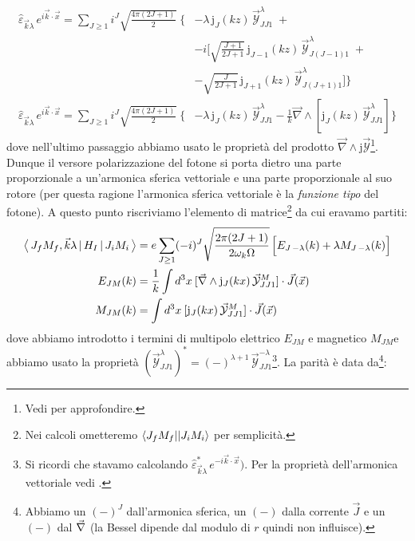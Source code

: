 \begin{displaymath}
\begin{aligned}
\widehat{\varepsilon}_{\vec{k}\lambda}\, e^{i\vec{k}\cdot\vec{x}} = \sum_{J \geq 1} i^J \sqrt{\frac{4\pi (2J+1)}{2}} \;\Biggl \{& -\lambda \,\mathrm{j}_J (kz) \, \vec{\mathcal{Y}}^\lambda_{JJ1}\; + \\
&-i\Biggl [\sqrt{\frac{J+1}{2J+1}} \,\mathrm{j}_{J-1} (kz) \, \vec{\mathcal{Y}}^\lambda_{J(J-1)1}\; + \\
& -\sqrt{\frac{J}{2J+1}} \,\mathrm{j}_{J+1} (kz) \, \vec{\mathcal{Y}}^\lambda_{J(J+1)1} \Biggr ] \Biggr \} \\
%
\widehat{\varepsilon}_{\vec{k}\lambda}\, e^{i\vec{k}\cdot\vec{x}} = \sum_{J \geq 1} i^J \sqrt{\frac{4\pi (2J+1)}{2}} \;\Biggl \{&-\lambda\,\mathrm{j}_J (kz) \, \vec{\mathcal{Y}}^\lambda_{JJ1} - \frac{1}{k} \vec{\nabla}\land [\mathrm{j}_J (kz)\, \vec{\mathcal{Y}}^\lambda_{JJ1}]\Biggr \}
\end{aligned}
\end{displaymath}
dove nell'ultimo passaggio abbiamo usato le proprietà del prodotto $\vec{\nabla}\land \mathrm{j}\vec{\mathcal{Y}}$\footnote{Vedi  per approfondire.}. Dunque il versore polarizzazione del fotone si porta dietro una parte proporzionale a un'armonica sferica vettoriale e una parte proporzionale al suo rotore (per questa ragione l'armonica sferica vettoriale è la \textit{funzione tipo} del fotone). A questo punto riscriviamo l'elemento di matrice\footnote{Nei calcoli ometteremo $\langle J_f M_f||J_i M_i\rangle$ per semplicità.} da cui eravamo partiti:
\begin{displaymath}
\begin{aligned}
\bigl\langle\, J_f M_f,\vec{k}\lambda\, |\,H_I\, |\,J_i M_i\, \bigr\rangle &= e \sum_{J\geq 1} (-i)^J \sqrt{\frac{2\pi(2J+1)}{2\omega_k\Omega}} \, \Bigl [ E_{J\,-\lambda} (k) + \lambda M_{J\,-\lambda} (k) \Bigr ] \\
E_{JM}(k) &= \frac{1}{k}\int d^3x\: [\vec{\nabla}\land \mathrm{j}_J (kx)\, \vec{\mathcal{Y}}^M_{JJ1}]\cdot \vec{J}(\vec{x}) \\
M_{JM}(k) &= \int d^3x\: [\mathrm{j}_J (kx)\, \vec{\mathcal{Y}}^M_{JJ1}]\cdot \vec{J}(\vec{x}) \\
\end{aligned}
\end{displaymath}
dove abbiamo introdotto i termini di multipolo elettrico $E_{JM}$ e magnetico $M_{JM}$e abbiamo usato la proprietà $(\vec{\mathcal{Y}}^{\lambda}_{JJ1})^* = (-)^{\lambda+1}\,\vec{\mathcal{Y}}^{-\lambda}_{JJ1}$\footnote{Si ricordi che stavamo calcolando $\widehat{\varepsilon}_{\vec{k}\lambda}^*\, e^{-i\vec{k}\cdot\vec{x}})$. Per la proprietà dell'armonica vettoriale vedi .}. La parità è data da\footnote{Abbiamo un $(-)^J$ dall'armonica sferica, un $(-)$ dalla corrente $\vec{J}$ e un $(-)$ dal $\vec{\nabla}$ (la Bessel dipende dal modulo di $r$ quindi non influisce).}:
